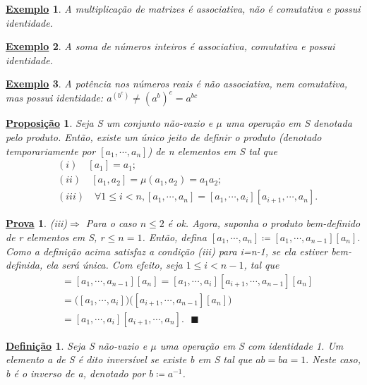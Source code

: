 \documentclass{article}
\newtheorem*{def*}{\underline{Defini\c c\~ao}}
\newtheorem*{prop*}{\underline{Proposi\c c\~ao}}
\newtheorem{example*}{\underline{Exemplo}}
\newtheorem*{proof*}{\underline{Prova}}
\renewcommand\qedsymbol{$\blacksquare$}
\begin{document}
 \begin{example*}
   A multiplica\c c\~ao de matrizes \'e associativa, n\~ao \'e comutativa e possui identidade.
 \end{example*}
\begin{example*}
  A soma de n\'umeros inteiros \'e associativa, comutativa e possui identidade.
\end{example*}
\begin{example*}
  A pot\^encia nos n\'umeros reais \'e n\~ao associativa, nem comutativa, mas possui identidade: $a^{(b^{c})} \neq (a^{b})^{c} = a^{bc}$
\end{example*}

\begin{prop*}
  Seja S um conjunto n\~ao-vazio e $\mu$ uma opera\c c\~ao em S denotada pelo produto. Ent\~ao, existe um \'unico jeito de definir o
produto (denotado temporariamente por $[a_{1}, \cdots, a_{n}]$) de n elementos em S tal que 
\begin{align*}
  &(i)\quad [a_{1}] = a_{1}; \\
  &(ii)\quad [a_{1}, a_{2}] = \mu(a_{1}, a_{2}) = a_{1}a_{2}; \\
  &(iii)\quad\forall 1\leq{i}<n, [a_{1}, \cdots, a_{n}] = [a_{1}, \cdots, a_{i}][a_{i+1}, \cdots, a_{n}].
\end{align*}
\end{prop*}
\begin{proof*}
  (iii)$\Rightarrow$ Para o caso $n\leq{2}$ \'e ok. Agora, suponha o produto bem-definido de r elementos em S, $r\leq{n=1}$. Ent\~ao,
  defina $[a_{1}, \cdots, a_{n}]\coloneqq [a_{1}, \cdots, a_{n-1}][a_{n}]. $ Como a defini\c c\~ao acima satisfaz a condi\c c\~ao (iii) para
i=n-1, se ela estiver bem-definida, ela ser\'a \'unica. Com efeito, seja $1\leq{i}<n-1$, tal que 
  \begin{align*}
    [a_{1}, \cdots, a_{n}] &= [a_{1}, \cdots, a_{n-1}][a_{n}] = [a_{1}, \cdots, a_{i}][a_{i+1}, \cdots, a_{n-1}][a_{n}]\\
                           &= \biggl([a_{1}, \cdots, a_{i}]\biggr)\biggl([a_{i+1}, \cdots, a_{n-1}][a_{n}]\biggr) \\
                           &= [a_{1}, \cdots, a_{i}][a_{i+1}, \cdots, a_{n}].\text{ \qedsymbol}
  \end{align*}
\end{proof*}
\begin{def*}
  Seja S n\~ao-vazio e $\mu$ uma opera\c c\~ao em S com identidade 1. Um elemento a de S \'e dito invers\'ivel se existe b em S tal que
 $ab = ba = 1.$ Neste caso, b \'e o inverso de a, denotado por $b\coloneqq a^{-1}$.
\end{def*}
\end{document}
